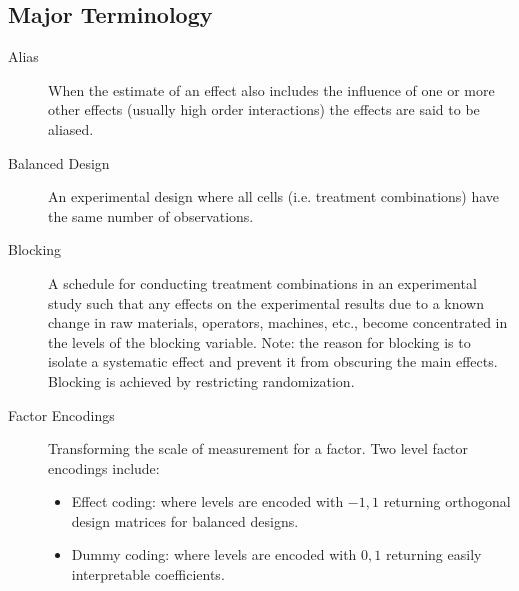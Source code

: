 \subsection{Major Terminology}

\begin{description}
\item [Alias] When the estimate of an effect also includes the influence of one or more other effects (usually high order interactions) the effects are said to be aliased.
\item [Balanced Design] An experimental design where all cells (i.e. treatment combinations) have the same number of observations.
\item [Blocking] A schedule for conducting treatment combinations in an experimental study such that any effects on the experimental results due to a known change in raw materials, operators, machines, etc., become concentrated in the levels of the blocking variable. Note: the reason for blocking is to isolate a systematic effect and prevent it from obscuring the main effects. Blocking is achieved by restricting randomization.
\item [Factor Encodings] Transforming the scale of measurement for a factor. 
Two level factor encodings include:
\begin{itemize}
\item Effect coding: where levels are encoded with $-1,1$ returning orthogonal design matrices for balanced designs.
\item Dummy coding: where levels are encoded with $0,1$ returning easily interpretable coefficients.
\end{itemize}


\end{description}

